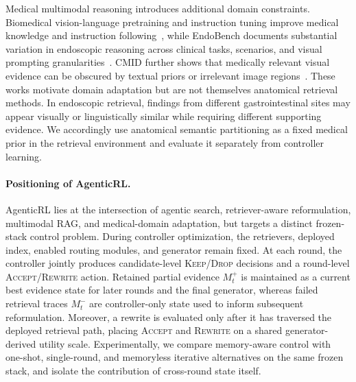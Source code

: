 Medical multimodal reasoning introduces additional domain constraints.
Biomedical vision-language pretraining and instruction tuning improve medical
knowledge and instruction following~\cite{li2023llavamed}, while EndoBench
documents substantial variation in endoscopic reasoning across clinical tasks,
scenarios, and visual prompting granularities~\cite{liu2025endobench}. CMID
further shows that medically relevant visual evidence can be obscured by
textual priors or irrelevant image regions~\cite{zhu2026cmid}. These works
motivate domain adaptation but are not themselves anatomical retrieval
methods. In endoscopic retrieval, findings from different gastrointestinal
sites may appear visually or linguistically similar while requiring different
supporting evidence. We accordingly use anatomical semantic partitioning as a
fixed medical prior in the retrieval environment and evaluate it separately
from controller learning.

\paragraph{Positioning of AgenticRL.}
AgenticRL lies at the intersection of agentic search, retriever-aware
reformulation, multimodal RAG, and medical-domain adaptation, but targets a
distinct frozen-stack control problem. During controller optimization, the
retrievers, deployed index, enabled routing modules, and generator remain
fixed. At each round, the controller jointly produces
candidate-level \textsc{Keep}/\textsc{Drop} decisions and a round-level
\textsc{Accept}/\textsc{Rewrite} action. Retained partial evidence $M_t^+$
is maintained as a current best evidence state for later rounds and the final
generator, whereas failed
retrieval traces $M_t^-$ are controller-only state used to inform subsequent
reformulation. Moreover, a rewrite is evaluated only after it has traversed
the deployed retrieval path, placing \textsc{Accept} and \textsc{Rewrite} on a
shared generator-derived utility scale. Experimentally, we compare memory-aware
control with one-shot, single-round, and memoryless iterative alternatives on
the same frozen stack, and isolate the contribution of cross-round state itself.
